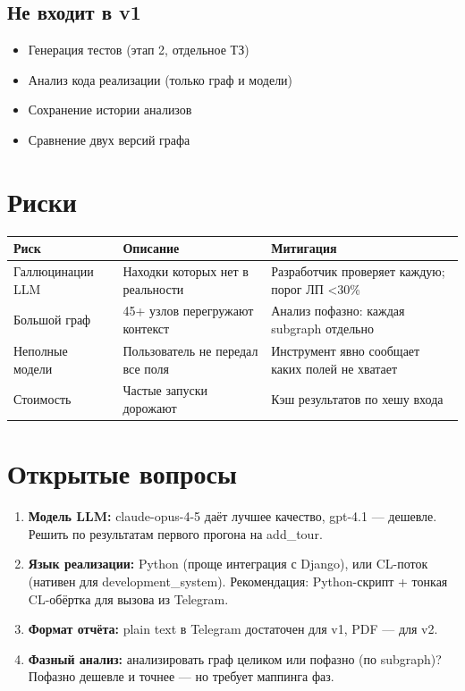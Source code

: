 \documentclass[11pt, a4paper, oneside]{article}
\begin{document}
\subsection{Не входит в v1}

\begin{itemize}
  \item Генерация тестов (этап 2, отдельное ТЗ)
  \item Анализ кода реализации (только граф и модели)
  \item Сохранение истории анализов
  \item Сравнение двух версий графа
\end{itemize}

\section{Риски}

\begin{center}
\begin{tabularx}{\textwidth}{lLl}
  \toprule
  \textbf{Риск} & \textbf{Описание} & \textbf{Митигация} \\
  \midrule
  Галлюцинации LLM
    & Находки которых нет в реальности
    & Разработчик проверяет каждую; порог ЛП \textless 30\% \\
  Большой граф
    & 45+ узлов перегружают контекст
    & Анализ пофазно: каждая subgraph отдельно \\
  Неполные модели
    & Пользователь не передал все поля
    & Инструмент явно сообщает каких полей не хватает \\
  Стоимость
    & Частые запуски дорожают
    & Кэш результатов по хешу входа \\
  \bottomrule
\end{tabularx}
\end{center}

\section{Открытые вопросы}

\begin{enumerate}
  \item \textbf{Модель LLM:} claude-opus-4-5 даёт лучшее качество,
    gpt-4.1 — дешевле. Решить по результатам первого прогона на add\_tour.
  \item \textbf{Язык реализации:} Python (проще интеграция с Django),
    или CL-поток (нативен для development\_system). Рекомендация: Python-скрипт
    + тонкая CL-обёртка для вызова из Telegram.
  \item \textbf{Формат отчёта:} plain text в Telegram достаточен для v1,
    PDF — для v2.
  \item \textbf{Фазный анализ:} анализировать граф целиком или пофазно
    (по subgraph)? Пофазно дешевле и точнее — но требует маппинга фаз.
\end{enumerate}
\end{document}
